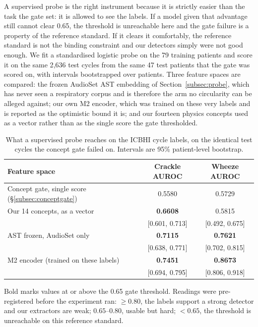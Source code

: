 \documentclass[journal,onecolumn]{IEEEtran}
\newcommand{\best}[1]{\textbf{#1}}
\begin{document}
A supervised probe is the right instrument because it is strictly easier than the task
the gate set: it is allowed to see the labels. If a model given that advantage still
cannot clear 0.65, the threshold is unreachable here and the gate failure is a property
of the reference standard. If it clears it comfortably, the reference standard is not
the binding constraint and our detectors simply were not good enough. We fit a
standardised logistic probe on the 79 training patients and score it on the same 2{,}636
test cycles from the same 47 test patients that the gate was scored on, with intervals
bootstrapped over patients. Three feature spaces are compared: the frozen AudioSet AST
embedding of Section~\ref{subsec:probe}, which has never seen a respiratory corpus and
is therefore the arm no circularity can be alleged against; our own M2 encoder, which
was trained on these very labels and is reported as the optimistic bound it is; and our
fourteen physics concepts used as a vector rather than as the single score the gate
thresholded.

\begin{table}[!t]
\centering
\caption{What a supervised probe reaches on the ICBHI cycle labels, on the identical
test cycles the concept gate failed on. Intervals are 95\% patient-level bootstrap.}
\label{tab:ceiling}
\begin{tabular}{lcc}
\toprule
Feature space & Crackle AUROC & Wheeze AUROC \\
\midrule
Concept gate, single score (\S\ref{subsec:conceptgate}) & 0.5580 & 0.5729 \\
\midrule
Our 14 concepts, as a vector   & \best{0.6608} & 0.5815 \\
                               & \footnotesize[0.601, 0.713] & \footnotesize[0.492, 0.675] \\
AST frozen, AudioSet only      & \best{0.7115} & \best{0.7621} \\
                               & \footnotesize[0.638, 0.771] & \footnotesize[0.702, 0.815] \\
M2 encoder (trained on these labels) & \best{0.7451} & \best{0.8673} \\
                               & \footnotesize[0.694, 0.795] & \footnotesize[0.806, 0.918] \\
\bottomrule
\end{tabular}

\vspace{2pt}
\footnotesize Bold marks values at or above the 0.65 gate threshold. Readings were
pre-registered before the experiment ran: $\ge 0.80$, the labels support a strong
detector and our extractors are weak; $0.65$--$0.80$, usable but hard; $<0.65$, the
threshold is unreachable on this reference standard.
\end{table}
\end{document}
